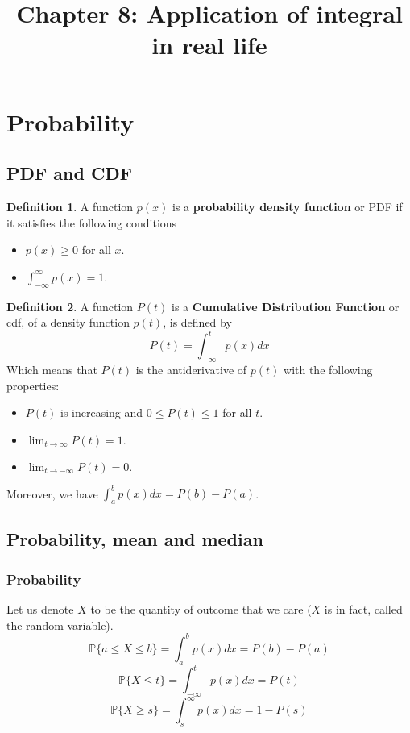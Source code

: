 \documentclass[12pt]{article}
\date{}
\title{Chapter 8: Application of integral in real life}
\theoremstyle{definition}
\theoremstyle{definition}
\newtheorem{definition}{Definition}[section]
\theoremstyle{remark}
\theoremstyle{definition}
\theoremstyle{definition}
\theoremstyle{definition}
\begin{document}
\maketitle

\section{Probability}
\subsection{PDF and CDF}
\begin{definition}
A function $p(x)$ is a \textbf{probability density function} or PDF if it satisfies the following conditions
\begin{itemize}
\item $p(x) \geq 0$ for all $x$.
\item $\int_{-\infty}^\infty p(x) = 1.$
\end{itemize}
\end{definition}

\begin{definition}
A function $P(t)$ is a \textbf{Cumulative Distribution Function} or cdf, of a density function $p(t)$, is defined by 
\[P(t) =\int_{-\infty}^t p(x) dx \]
Which means that $P(t)$ is the antiderivative of $p(t)$ with the following properties:
\begin{itemize}
\item $P(t)$ is increasing and $0\leq P(t)\leq 1$ for all $t$.
\item $\lim_{t \to \infty}P(t)=1.$
\item $\lim_{t \to -\infty}P(t)=0.$
\end{itemize}
\end{definition}

Moreover, we have $\int_a^b p(x)dx=P(b)-P(a)$.

\subsection{Probability, mean and median}

\subsubsection*{Probability}
Let us denote $X$ to be the quantity of outcome that we care ($X$ is in fact, called the random variable).
\[\mathbb{P}\{a\leq X\leq b\}=\int_a^b p(x)dx=P(b)-P(a)\]
\[\mathbb{P}\{X\leq t\}=\int_{-\infty}^t p(x)dx=P(t)\]
\[\mathbb{P}\{X\geq s\}=\int_{s}^\infty p(x)dx=1-P(s)\]
\end{document}
